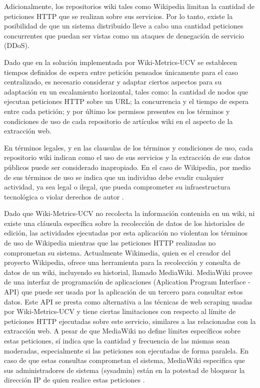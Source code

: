 Adicionalmente, los repositorios wiki tales como Wikipedia limitan la cantidad de peticiones HTTP que se
realizan sobre sus servicios. Por lo tanto, existe la posibilidad de que
un sistema distribuido lleve a cabo una cantidad peticiones concurrentes que puedan
ser vistas como un ataques de denegación de servicio (DDoS).

Dado que en la solución implementada por Wiki-Metrics-UCV se establecen tiempos definidos
de espera entre petición pensados únicamente para el caso centralizado, es necesario
considerar y adaptar ciertos aspectos para su adaptación en un escalamiento horizontal,
tales como: la cantidad de nodos que ejecutan peticiones HTTP sobre un URL; la
concurrencia y el tiempo de espera entre cada petición; y por último los permisos
presentes en los términos y condiciones de uso de cada repositorio de artículos wiki en
el aspecto de la extracción web.

En términos legales, y en las clausulas de los términos y condiciones de uso, cada repositorio
wiki indican como el uso de sus servicios y la extracción de sus datos públicos puede ser considerado
inapropiado. En el caso de Wikipedia, por medio de sus términos de uso se indica que un individuo debe
evadir cualquier actividad, ya sea legal o ilegal, que pueda comprometer su infraestructura tecnológica o
violar derechos de autor \cite{7}.

Dado que Wiki-Metrics-UCV no recolecta la información contenida en un wiki, ni
existe una cláusula específica sobre la recolección de datos de los historiales de edición,
las actividades ejecutadas por esta aplicación no violentan los términos de uso de
Wikipedia mientras que las peticiones HTTP realizadas no comprometan su sistema.
Actualmente Wikimedia, quien es el creador del proyecto Wikipedia, ofrece una
herramienta para la recolección y consulta de datos de un wiki, incluyendo su historial,
llamado MediaWiki. MediaWiki provee de una interfaz de programación de aplicaciones
(Aplication Program Interface - API) que puede ser usada por la aplicación de un tercero
para consultar estos datos. Este API se presta como alternativa a las técnicas de
web scraping usadas por Wiki-Metrics-UCV y tiene ciertas limitaciones con respecto al límite
de peticiones HTTP ejecutadas sobre este servicio, similares a las relacionadas con la
extracción web. A pesar de que MediaWiki no define límites específicos sobre estas
peticiones, sí indica que la cantidad y frecuencia de las mismas sean moderadas,
especialmente si las peticiones son ejecutadas de forma paralela. En caso de que estas
consultas comprometan el sistema, MediaWiki especifica que sus administradores de
sistema (sysadmin) están en la potestad de bloquear la dirección IP de quien realice
estas peticiones \cite{8}.

